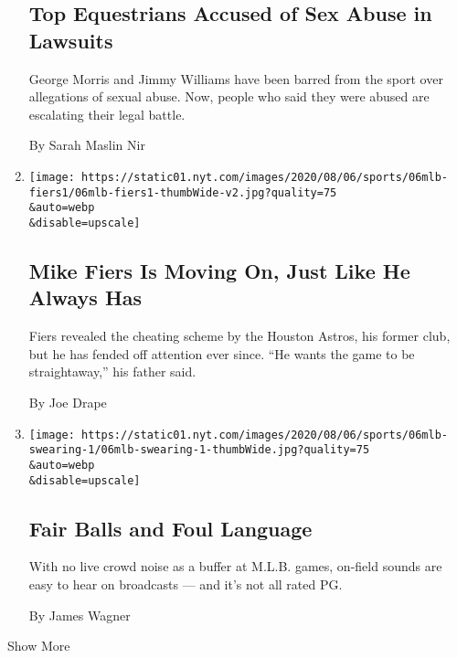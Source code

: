 \begin{enumerate}
  \hypertarget{top-equestrians-accused-of-sex-abuse-in-lawsuits}{%
  \subsection{Top Equestrians Accused of Sex Abuse in
  Lawsuits}\label{top-equestrians-accused-of-sex-abuse-in-lawsuits}}

  George Morris and Jimmy Williams have been barred from the sport over
  allegations of sexual abuse. Now, people who said they were abused are
  escalating their legal battle.

  By Sarah Maslin Nir
\item
  \href{/2020/08/06/sports/as-mike-fiers-astros-cheating.html}{}

  \texttt{[image: https://static01.nyt.com/images/2020/08/06/sports/06mlb-fiers1/06mlb-fiers1-thumbWide-v2.jpg?quality=75\\\&auto=webp\\\&disable=upscale]}

  \hypertarget{mike-fiers-is-moving-on-just-like-he-always-has}{%
  \subsection{Mike Fiers Is Moving On, Just Like He Always
  Has}\label{mike-fiers-is-moving-on-just-like-he-always-has}}

  Fiers revealed the cheating scheme by the Houston Astros, his former
  club, but he has fended off attention ever since. ``He wants the game
  to be straightaway,'' his father said.

  By Joe Drape
\item
  \href{/2020/08/06/sports/baseball/mlb-swearing.html}{}

  \texttt{[image: https://static01.nyt.com/images/2020/08/06/sports/06mlb-swearing-1/06mlb-swearing-1-thumbWide.jpg?quality=75\\\&auto=webp\\\&disable=upscale]}

  \hypertarget{fair-balls-and-foul-language}{%
  \subsection{Fair Balls and Foul
  Language}\label{fair-balls-and-foul-language}}

  With no live crowd noise as a buffer at M.L.B. games, on-field sounds
  are easy to hear on broadcasts --- and it's not all rated PG.

  By James Wagner
\end{enumerate}

Show More


